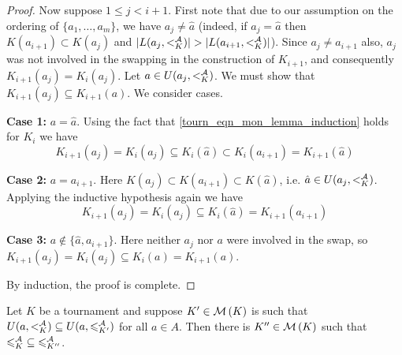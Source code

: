 \begin{proof}
    Now suppose $1 \le j < i + 1$. First note that due to our assumption on the
    ordering of $\{a_1,\ldots,a_m\}$, we have $a_j \ne \hat{a}$ (indeed, if
    $a_j = \hat{a}$ then $K(a_{i+1}) \subset K(a_j)$ and $|L(a_j, {<^{\mathcal{A}}_K})| >
    |L(a_{i+1}, {<^{\mathcal{A}}_K})|$). Since $a_j \ne a_{i+1}$ also, $a_j$ was not
    involved in the swapping in the construction of $K_{i+1}$, and consequently
    $K_{i+1}(a_j) = K_i(a_j)$. Let $a \in U(a_j, {<^{\mathcal{A}}_K})$. We must show that
    $K_{i+1}(a_j) \subseteq K_{i+1}(a)$. We consider cases.

    \textbf{Case 1:} $a = \hat{a}$. Using the fact that
    \cref{tourn_eqn_mon_lemma_induction} holds for $K_i$ we have
    \[
        K_{i+1}(a_j)
        = K_i(a_j)
        \subseteq K_i(\hat{a})
        \subset K_i(a_{i+1})
        = K_{i+1}(\hat{a})
    \]

    \textbf{Case 2:} $a = a_{i+1}$. Here $K(a_j) \subset K(a_{i+1}) \subset
    K(\hat{a})$, i.e. $\hat{a} \in U(a_j, {<^{\mathcal{A}}_K})$. Applying the inductive
    hypothesis again we have
    \[
        K_{i+1}(a_j)
        = K_i(a_j)
        \subseteq K_i(\hat{a})
        = K_{i+1}(a_{i+1})
    \]

    \textbf{Case 3:} $a \notin \{\hat{a}, a_{i+1}\}$. Here neither $a_j$ nor
    $a$ were involved in the swap, so $K_{i+1}(a_j) = K_i(a_j) \subseteq K_i(a)
    = K_{i+1}(a)$.

    By induction, the proof is complete.
\end{proof}

\begin{lemma}
    \label{tourn_result_chainmin_mon_extend_full}
    Let $K$ be a tournament and suppose $K' \in \operatorname{\mathcal{M}}\left({K}\right)$ is such that $U(a,
    {<^{\mathcal{A}}_K}) \subseteq U(a, {\leqslant^{\mathcal{A}}_{K'}})$ for all $a \in A$. Then there is
    $K'' \in \operatorname{\mathcal{M}}\left({K}\right)$ such that ${\leqslant^{\mathcal{A}}_K} \subseteq {\leqslant^{\mathcal{A}}_{K''}}$.


\end{lemma}

